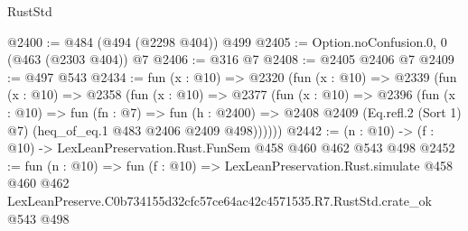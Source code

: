 \begin{lexlean}{RustStd}
\begin{coremodule}
@2400 := @484 (@494 (@2298 @404)) @499
@2405 := Option.noConfusion.{0, 0} (@463 (@2303 @404)) @7
@2406 := @316 @7
@2408 := @2405 @2406 @7
@2409 := @497 @543
@2434 := fun (x : @10) =>
  @2320
    (fun (x : @10) =>
    @2339
      (fun (x : @10) =>
      @2358
        (fun (x : @10) =>
        @2377
          (fun (x : @10) =>
          @2396
            (fun (x : @10) =>
            fun (fn : @7) =>
            fun (h : @2400) =>
            @2408 @2409 (Eq.refl.{2} (Sort 1) @7) (heq_of_eq.{1} @483 @2406 @2409 @498))))))
@2442 := (n : @10) -> (f : @10) -> LexLeanPreservation.Rust.FunSem @458 @460 @462 @543 @498
@2452 := fun (n : @10) =>
  fun (f : @10) =>
  LexLeanPreservation.Rust.simulate
    @458
    @460
    @462
    LexLeanPreserve.C0b734155d32cfc57ce64ac42c4571535.R7.RustStd.crate_ok
    @543
    @498
\end{coremodule}
\end{lexlean}
